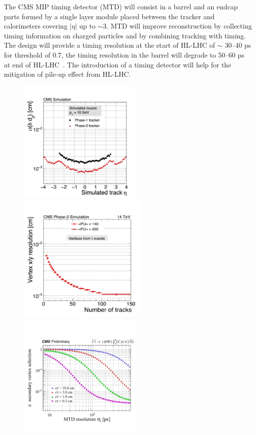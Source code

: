 The CMS MIP timing detector (MTD) will
consist in a barrel and an endcap parts formed by a single layer
module placed between the tracker
and calorimeters covering $|\eta|$ up to $\sim$3.
MTD will improve reconstruction by collecting timing information on
charged particles and by combining tracking with timing. The design will provide a timing resolution
at the start of HL-LHC of $\sim$ 30--40 ps for \pt threshold of
0.7\GeV, the timing resolution in the barrel will degrade to 50--60 ps
at end of HL-LHC~\cite{Marta}. The introduction of a timing detector will help for
the mitigation of pile-up effect from HL-LHC.
\begin{figure}[h]
\centering
    \includegraphics[clip,trim=0.5cm 0cm 0.cm 1.8cm, height =6cm]{Figures/c7/IPrel.pdf}
    \includegraphics[clip,trim=0.5cm 0cm 0.cm 1.3cm, height = 6.3cm]{Figures/c7/vertexrel.pdf}\\
    \includegraphics[clip,trim=0.5cm 1cm 0.cm 3cm, height = 6cm]{Figures/c7/MDT.pdf}

\end{figure}

